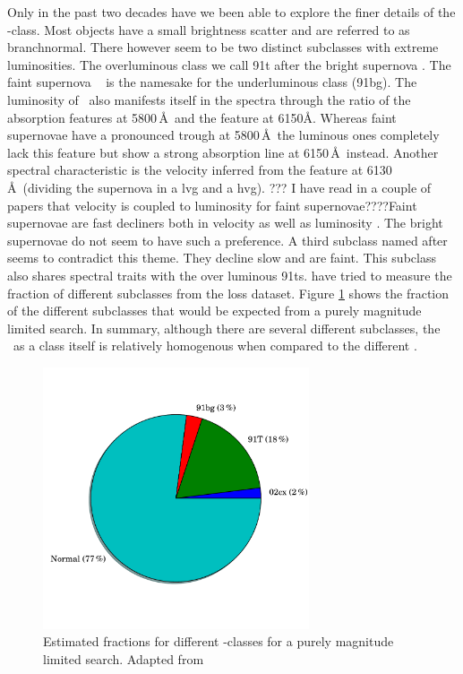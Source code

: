 Only in the past two decades have we been able to explore the finer details of the \sneia-class. Most objects have a small brightness scatter and are referred to as \gls{branchnormal}. There however seem to be two distinct subclasses with extreme luminosities. The overluminous class we call \gls{91t} after the bright supernova  \citet{1992AJ....103.1632P}. The faint supernova \ \citep{1992AJ....104.1543F} is the namesake for the underluminous class (\gls{91bg}). The luminosity of \sneia\ also manifests itself in the spectra through the ratio of the  absorption features at 5800\,\AA\ and the feature at 6150\AA. Whereas faint supernovae have a pronounced trough at 5800\,\AA\ the luminous ones completely lack this feature but show a strong absorption line at 6150\,\AA\ instead. Another spectral characteristic is the velocity inferred from the  feature at 6130\,\AA\ (dividing the supernova in a \gls{lvg} and a \gls{hvg}). ??? I have read in a couple of papers that velocity is coupled to luminosity for faint supernovae????Faint supernovae are fast decliners both in velocity as well as luminosity \citet{2005ApJ...623.1011B}. The bright supernovae do not seem to have such a preference. A third subclass named after \ \citep{2003PASP..115..453L} seems to contradict this theme. They decline slow and are faint. This subclass also shares spectral traits with the over luminous \glspl{91t}. \citet{2011MNRAS.412.1441L} have tried to measure the fraction of different subclasses from the \gls{loss} dataset. Figure \ref{fig:ia_fracs} shows the fraction of the different subclasses that would be expected from a purely magnitude limited search. In summary, although there are several different subclasses, the \snia\ as a class itself is relatively homogenous when compared to the different \sneii.

\begin{figure}[htbp] %
   \centering
   \includegraphics[width=0.7\textwidth, trim=0 2.5cm 0 0cm]{chapter_intro/plots/plot_ia_fracs.pdf} 
   \caption{Estimated fractions for different -classes for a purely magnitude limited search. Adapted from \citet{2011MNRAS.412.1441L}}
   \label{fig:ia_fracs}
\end{figure}

